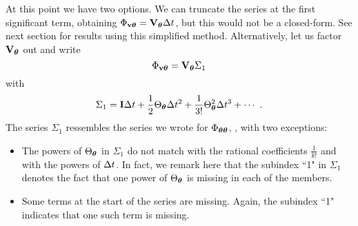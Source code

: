 At this point we have two options. 
We can truncate the series at the first significant term, obtaining $\Phi_{{\bf v}{\bm \theta}} = {\bf V}_{\bm \theta}\Delta t$, but this would not be a closed-form. 
See next section for results using this simplified method.
Alternatively, let us factor ${\bf V}_{\bm \theta}$ out and write
%
\begin{equation}
\Phi_{{\bf v}{\bm \theta}} = {\bf V}_{\bm \theta}\Sigma_1
\end{equation}
%
with
%
\begin{equation}
\Sigma_1 = {\bf I}\Delta t 
+ \frac{1}{2}\Theta_{\bm \theta}\Delta t^2 
+ \frac{1}{3!}\Theta_{\bm \theta}^2\Delta t^3
+\cdots~.
\end{equation}
%
The series $\Sigma_1$ ressembles the series we wrote for $\Phi_{{\bm \theta}{\bm \theta}}$, , with two exceptions:
\begin{itemize}
\item The powers of $\Theta_{\bm \theta}$ in $\Sigma_1$ do not match with the rational coefficients $\tfrac{1}{k!}$ and with the powers of 
$\Delta t$. 
In fact, we remark here that the subindex ``1" in $\Sigma_1$ denotes the fact that one power of $\Theta_{\bm \theta}$ is missing in each of the members.

\item Some terms at the start of the series are missing. 
Again, the subindex ``1" indicates that one such term is missing.
\end{itemize}

